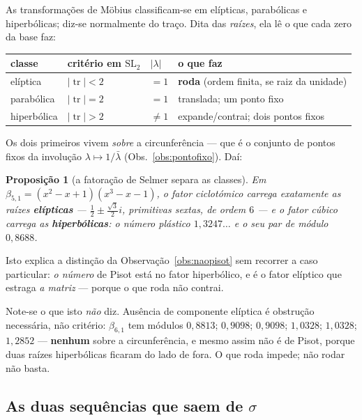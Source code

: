 \documentclass[11pt,a4paper]{article}
\theoremstyle{plain}
\newtheorem{proposicao}[teorema]{Proposição}
\theoremstyle{definition}
\theoremstyle{remark}
\newcommand{\SL}{\mathrm{SL}}
\begin{document}
As transformações de Möbius classificam-se em elípticas, parabólicas e hiperbólicas; diz-se
normalmente do traço. Dita das \emph{raízes}, ela lê o que cada zero da base faz:

\begin{center}\small
\begin{tabular}{llll}
\hline
classe & critério em $\SL_2$ & $|\lambda|$ & o que faz \\ \hline
elíptica & $|\operatorname{tr}|<2$ & $=1$ & \textbf{roda} (ordem finita, se raiz da unidade) \\
parabólica & $|\operatorname{tr}|=2$ & $=1$ & translada; um ponto fixo \\
hiperbólica & $|\operatorname{tr}|>2$ & $\neq1$ & expande/contrai; dois pontos fixos \\
\hline
\end{tabular}
\end{center}

\noindent Os dois primeiros vivem \emph{sobre} a circunferência --- que é o conjunto de pontos
fixos da involução $\lambda\mapsto1/\bar\lambda$ (Obs.~\ref{obs:pontofixo}). Daí:

\begin{proposicao}[a fatoração de Selmer separa as classes]\label{prop:classes}
Em $\beta_{5,1} = (x^2-x+1)(x^3-x-1)$, o fator ciclotómico carrega exatamente as raízes
\textbf{elípticas} --- $\tfrac12\pm\tfrac{\sqrt3}{2}i$, primitivas sextas, de ordem $6$ --- e o
fator cúbico carrega as \textbf{hiperbólicas}: o número plástico $1{,}3247\ldots$ e o seu par de
módulo $0{,}8688$.
\end{proposicao}

\noindent Isto explica a distinção da Observação~\ref{obs:naopisot} sem recorrer a caso particular:
\emph{o número} de Pisot está no fator hiperbólico, e é o fator elíptico que estraga \emph{a
matriz} --- porque o que roda não contrai.

Note-se o que isto \emph{não} diz. Ausência de componente elíptica é obstrução necessária, não
critério: $\beta_{6,1}$ tem módulos $0{,}8813$; $0{,}9098$; $0{,}9098$; $1{,}0328$; $1{,}0328$;
$1{,}2852$ --- \textbf{nenhum} sobre a circunferência, e mesmo assim não é de Pisot, porque duas
raízes hiperbólicas ficaram do lado de fora. O que roda impede; não rodar não basta.

\subsection{As duas sequências que saem de $\sigma$}\label{sec:sequencias}
\end{document}
